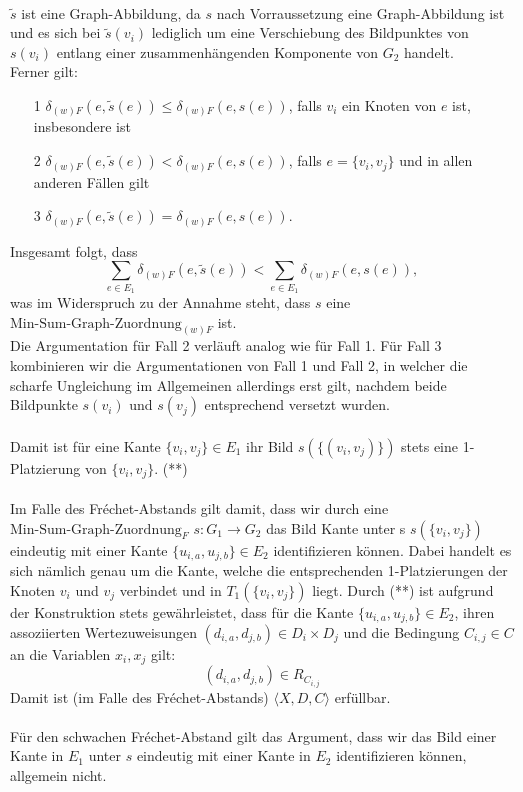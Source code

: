\documentclass[a4paper, 12pt, twoside]{article}
\theoremstyle{Format1} %
\begin{document}
\\
$\tilde{s}$ ist eine Graph-Abbildung, da $s$ nach Vorraussetzung eine Graph-Abbildung ist und es sich bei $\tilde{s}(v_i)$ lediglich um eine Verschiebung
des Bildpunktes von $s(v_i)$ entlang einer zusammenhängenden Komponente von $G_2$ handelt.
\\
Ferner gilt:
\begin{enumerate}
	\item[1] $\delta_{(w)F}(e, \tilde{s}(e)) \leq \delta_{(w)F}(e, s(e))$, falls $v_i$ ein Knoten von $e$ ist, insbesondere ist
	\item[2] $\delta_{(w)F}(e, \tilde{s}(e)) < \delta_{(w)F}(e, s(e))$, falls $e = \{v_i, v_j\}$ und in allen anderen Fällen gilt
	\item[3] $\delta_{(w)F}(e, \tilde{s}(e)) = \delta_{(w)F}(e, s(e))$.
\end{enumerate}
Insgesamt folgt, dass
$$\sum_{{e}\in E_1} \delta_{(w)F}(e, \tilde{s}(e)) < \sum_{{e}\in E_1} \delta_{(w)F}(e, s(e)),$$
was im Widerspruch zu der Annahme steht, dass $s$ eine $\text{Min-Sum-Graph-Zuordnung}_{(w)F}$ ist.
\\
Die Argumentation für Fall 2 verläuft analog wie für Fall 1.
Für Fall 3 kombinieren wir die Argumentationen von Fall 1 und Fall 2, in welcher die scharfe Ungleichung im Allgemeinen allerdings erst gilt,
nachdem beide Bildpunkte $s(v_i)$ und $s(v_j)$ entsprechend versetzt wurden.
\\
\\
Damit ist für eine Kante $\{v_i, v_j\} \in E_1$ ihr Bild $s(\{(v_i, v_j)\})$ stets eine 1-Platzierung von $\{v_i, v_j\}$. (**)
\\
\\
Im Falle des Fréchet-Abstands gilt damit, dass wir durch eine $\text{Min-Sum-Graph-Zuordnung}_F$ $s: G_1 \to G_2$ das Bild Kante unter s
$s(\{v_i, v_j\})$ eindeutig mit einer Kante $\{u_{i,a}, u_{j,b}\} \in E_2$ identifizieren können. Dabei handelt es sich nämlich genau um die Kante, welche
die entsprechenden 1-Platzierungen der Knoten $v_i$ und $v_j$ verbindet und in $T_1(\{v_i, v_j\})$ liegt.
Durch (**) ist aufgrund der Konstruktion stets gewährleistet, dass für die Kante $\{u_{i,a}, u_{j,b}\} \in E_2$, ihren assoziierten Wertezuweisungen $(d_{i,a}, d_{j,b}) \in D_i \times D_j$
und die Bedingung $C_{i,j} \in C$ an die Variablen $x_i, x_j$ gilt:
$$(d_{i,a},d_{j,b}) \in R_{C_{i,j}}$$
Damit ist (im Falle des Fréchet-Abstands) $\langle X,D,C \rangle$ erfüllbar.
\\
\\
Für den schwachen Fréchet-Abstand gilt das Argument, dass wir das Bild einer Kante in $E_1$ unter $s$ eindeutig mit einer Kante in $E_2$ identifizieren können, allgemein nicht.
\end{document}
